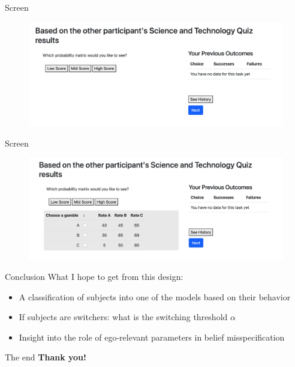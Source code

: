 \documentclass[aspectratio=169]{beamer}
\begin{document}
\begin{frame}{Screen}
    \begin{figure}
        \centering
        \includegraphics[scale=.4]{figures2/screen1.png}
    \end{figure}
\end{frame}

\begin{frame}{Screen}
    \begin{figure}
        \centering
        \includegraphics[scale=.4]{figures2/screen2.png}
    \end{figure}
\end{frame}


\begin{frame}{Conclusion}
What I hope to get from this design:\\
\bigskip
    \begin{itemize}
        \item A classification of subjects into one of the models based on their behavior\\
        \bigskip
        \item If subjects are switchers: what is the switching threshold $\alpha$\\
        \bigskip
        \item Insight into the role of ego-relevant parameters in belief misspecification
    \end{itemize}
\end{frame}

\begin{frame}{The end}
    \large\textbf{Thank you!}
\end{frame}
\end{document}

